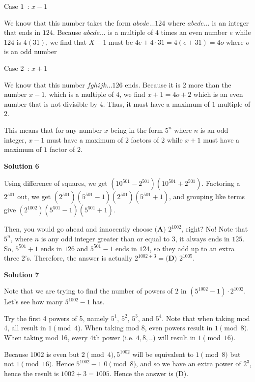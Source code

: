 \begin{enumerate}
 Case $1$ : $x-1$

 We know that this number takes the form $abcde... 124$ where $abcde...$ is an integer that ends in $124$. Because $abcde...$ is a multiple of $4$ times an even number $e$ while $124$ is $4(31)$, we find that $X-1$ must be $4e + 4 \cdot 31 = 4(e+31) = 4o$ where $o$ is an odd number

 Case $2$ : $x+1$

 We know that this number $fghijk...126$ ends. Because it is $2$ more than the number $x-1$, which is a multiple of $4$, we find $x+1 = 4o + 2$ which is an even number that is not divisible by $4$. Thus, it must have a maximum of $1$ multiple of $2$.

 This means that for any number $x$ being in the form $5^{n}$ where $n$ is an odd integer, $x-1$ must have a maximum of $2$ factors of $2$ while $x+1$ must have a maximum of $1$ factor of $2$. 

 


 



\textbf{Solution 6}

Using difference of squares, we get $\left(10^{501}-2^{501}\right) \left(10^{501}+2^{501}\right)$. Factoring a $2^{501}$ out, we get $\left(2^{501}\right) \left(5^{501}-1\right) \left(2^{501}\right) \left(5^{501}+1\right)$, and grouping like terms give $\left(2^{1002}\right) \left(5^{501}-1\right) \left(5^{501}+1\right)$. 

 
Then, you would go ahead and innocently choose $\textbf{(A) } 2^{1002}$, right? No! Note that $5^n$, where $n$ is any odd integer greater than or equal to $3$, it always ends in $125$. So, $5^{501}+1$ ends in $126$ and $5^{501}-1$ ends in $124$, so they add up to an extra three $2$'s. Therefore, the answer is actually $2^{1002+3}=\boxed{\textbf{(D) } 2^{1005}}$.

 



\textbf{Solution 7}

Note that we are trying to find the number of powers of $2$ in $(5^{1002}-1) \cdot 2^{1002}.$ Let's see how many $5^{1002}-1$ has.

 Try the first 4 powers of 5, namely $5^1$, $5^2$, $5^3$, and $5^4$. Note that when taking mod 4, all result in $1 \pmod 4$. When taking mod 8, even powers result in $1 \pmod 8$. When taking mod 16, every $4$th power (i.e. $4,8,..$) will result in $1 \pmod{16}$. 

 Because $1002$ is even but $2 \pmod 4, 5^{1002}$ will be equivalent to $1 \pmod 8$ but not $1 \pmod 16$. Hence $5^{1002} - 1$ \equiv $0 \pmod 8$, and so we have an extra power of $2^3$, hence the result is $1002+3=1005$. Hence the answer is (D).


\end{enumerate}
